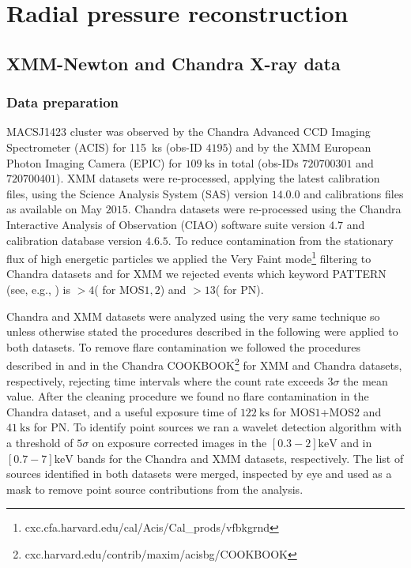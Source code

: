 \documentclass[twocolumn,traditabstract]{aa}
\begin{document}
\section{Radial pressure reconstruction}\label{sec:Radial_pressure_reconstruction}
\subsection{XMM-Newton and Chandra X-ray data}
\subsubsection{Data preparation}
MACSJ1423 cluster was observed by the Chandra Advanced CCD Imaging Spectrometer (ACIS) for \SI{115}{\kilo\second} (obs-ID $4195$) and by the XMM European Photon Imaging Camera (EPIC) for $\SI{109}{\kilo\second}$ in total (obs-IDs $720700301$ and $720700401$). XMM datasets were re-processed, applying the latest calibration files, using the Science Analysis System (SAS) version $14.0.0$ and calibrations files as available on May $2015$. Chandra datasets were re-processed using the Chandra Interactive Analysis of Observation (CIAO) software suite version $4.7$ and calibration database version $4.6.5$. To reduce contamination from the stationary flux of high energetic particles we applied the Very Faint mode\footnote{cxc.cfa.harvard.edu/cal/Acis/Cal\_prods/vfbkgrnd} filtering to Chandra datasets and for XMM we rejected events which keyword PATTERN (see, e.g., \citealt{pratt2007}) is $> 4$( for MOS$1,2$) and $>13$( for PN). 

Chandra and XMM datasets were analyzed using the very same technique so unless otherwise stated the procedures described in the following were applied to both datasets. To remove flare contamination we followed the procedures described in \cite{pratt2007} and in the Chandra COOKBOOK\footnote{cxc.harvard.edu/contrib/maxim/acisbg/COOKBOOK} for XMM and Chandra datasets, respectively, rejecting time intervals where the count rate exceeds $3\sigma$ the mean value. After the cleaning procedure we found no flare contamination in the Chandra dataset, and a useful exposure time of $\SI{122}{\kilo\second}$ for MOS$1$+MOS$2$ and $\SI{41}{\kilo\second}$ for PN.
To identify point sources we ran a wavelet detection algorithm with a threshold of $5\sigma$ on exposure corrected images in the $[0.3-2]\si{\kilo\electronvolt}$ and in $[0.7-7]\si{\kilo\electronvolt}$ bands for the Chandra and XMM datasets, respectively. The list of sources identified in both datasets were merged, inspected by eye and used as a mask to remove point source contributions from the analysis. 
\end{document}
